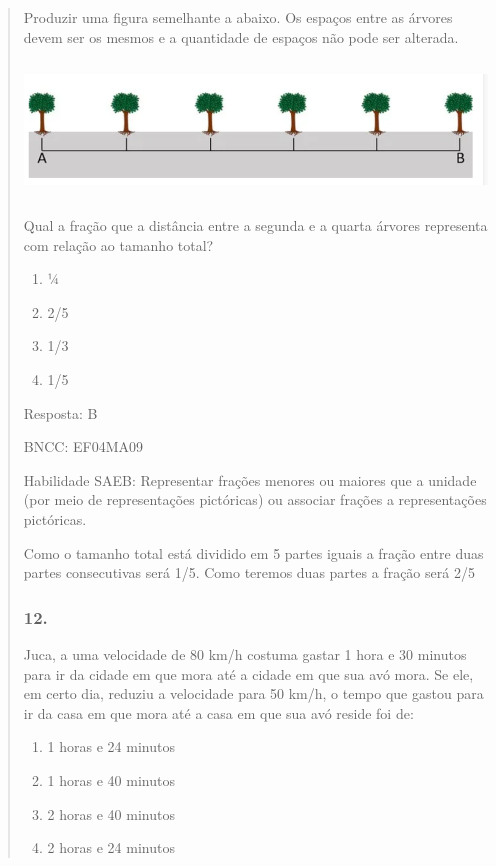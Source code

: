 \begin{enumerate}
\begin{escolha}
\begin{enumerate}
\begin{itemize}
\begin{itemize}
\begin{escolha}
\begin{quote}
\begin{escolha}
{Produzir uma figura semelhante a abaixo. Os espaços entre as árvores
devem ser os mesmos e a quantidade de espaços não pode ser alterada.

\includegraphics[width=5.90556in,height=1.41944in]{media/image147.png}

Qual a fração que a distância entre a segunda e a quarta árvores
representa com relação ao tamanho total?

\begin{enumerate}
\def\labelenumi{\alph{enumi})}
\item
  ¼
\item
  2/5
\item
  1/3
\item
  1/5
\end{enumerate}

Resposta: B

BNCC: EF04MA09

Habilidade SAEB: Representar frações menores ou maiores que a unidade
(por meio de representações pictóricas) ou associar frações a
representações pictóricas.

Como o tamanho total está dividido em 5 partes iguais a fração entre
duas partes consecutivas será 1/5. Como teremos duas partes a fração
será 2/5

\subsubsection{12.}\label{section-153}

Juca, a uma velocidade de 80 km/h costuma gastar 1 hora e 30 minutos
para ir da cidade em que mora até a cidade em que sua avó mora. Se ele,
em certo dia, reduziu a velocidade para 50 km/h, o tempo que gastou para
ir da casa em que mora até a casa em que sua avó reside foi de:

\begin{enumerate}
\def\labelenumi{\alph{enumi})}
\item
  1 horas e 24 minutos
\item
  1 horas e 40 minutos
\item
  2 horas e 40 minutos
\item
  2 horas e 24 minutos
\end{enumerate}

}
\end{escolha}
\end{quote}
\end{escolha}
\end{itemize}
\end{itemize}
\end{enumerate}
\end{escolha}
\end{enumerate}
